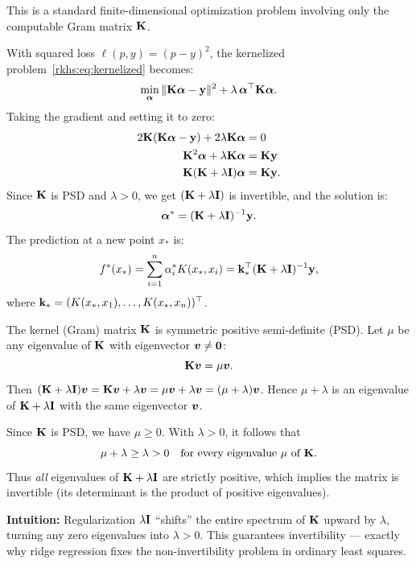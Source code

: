 \begin{notechapter}
This is a standard finite-dimensional optimization problem involving
only the computable Gram matrix $\mathbf{K}$.

\begin{examplebox}
With squared loss $\ell(p, y) = (p - y)^2$, the kernelized
problem~\eqref{rkhs:eq:kernelized} becomes:
\[
\min_{\boldsymbol{\alpha}} \| \mathbf{K}\boldsymbol{\alpha} - \mathbf{y} \|^2 + \lambda\,
\boldsymbol{\alpha}^\top \mathbf{K} \boldsymbol{\alpha}.
\]
Taking the gradient and setting it to zero:
\begin{align*}
2\mathbf{K}(\mathbf{K}\boldsymbol{\alpha} - \mathbf{y}) + 2\lambda\mathbf{K}\boldsymbol{\alpha} &= 0 \\
\mathbf{K}^2\boldsymbol{\alpha} + \lambda\mathbf{K}\boldsymbol{\alpha} &= \mathbf{K}\mathbf{y} \\
\mathbf{K}(\mathbf{K} + \lambda \mathbf{I})\boldsymbol{\alpha} &= \mathbf{K}\mathbf{y}.
\end{align*}
Since $\mathbf{K}$ is PSD and $\lambda > 0$, we get $(\mathbf{K} +
\lambda\mathbf{I})$ is invertible, and the solution is:
\[
\boldsymbol{\alpha}^* = (\mathbf{K} + \lambda\mathbf{I})^{-1}\mathbf{y}.
\]
The prediction at a new point $x_*$ is:
\[
f^*(x_*) = \sum_{i=1}^n \alpha_i^* K(x_*, x_i) = \mathbf{k}_*^\top (\mathbf{K}
+ \lambda\mathbf{I})^{-1}\mathbf{y},
\]
where $\mathbf{k}_* = (K(x_*, x_1), \ldots, K(x_*, x_n))^\top$.
\end{examplebox}

\begin{insightbox}
The kernel (Gram) matrix $\mathbf{K}$ is symmetric positive semi-definite (PSD).
Let $\mu$ be any eigenvalue of $\mathbf{K}$ with eigenvector $\boldsymbol{v} \neq \boldsymbol{0}$:
\[
\mathbf{K}\boldsymbol{v} = \mu \boldsymbol{v}.
\]
Then $(\mathbf{K} + \lambda\mathbf{I})\boldsymbol{v} = \mathbf{K}\boldsymbol{v} + \lambda\boldsymbol{v}
= \mu\boldsymbol{v} + \lambda\boldsymbol{v} = (\mu + \lambda)\boldsymbol{v}$.
Hence $\mu + \lambda$ is an eigenvalue of $\mathbf{K} + \lambda\mathbf{I}$
with the same eigenvector $\boldsymbol{v}$.

Since $\mathbf{K}$ is PSD, we have $\mu \ge 0$. With $\lambda > 0$,
it follows that
\[
\mu + \lambda \ge \lambda > 0 \quad \text{for every eigenvalue $\mu$ of $\mathbf{K}$}.
\]
Thus \emph{all} eigenvalues of $\mathbf{K} + \lambda\mathbf{I}$
are strictly positive, which implies the matrix is invertible
(its determinant is the product of positive eigenvalues).

\smallskip
\textbf{Intuition:} Regularization $\lambda\mathbf{I}$ ``shifts'' the entire
spectrum of $\mathbf{K}$ upward by $\lambda$, turning any zero eigenvalues
into $\lambda > 0$. This guarantees invertibility — exactly why ridge
regression fixes the non-invertibility problem in ordinary least squares.
\end{insightbox}


\end{notechapter}
